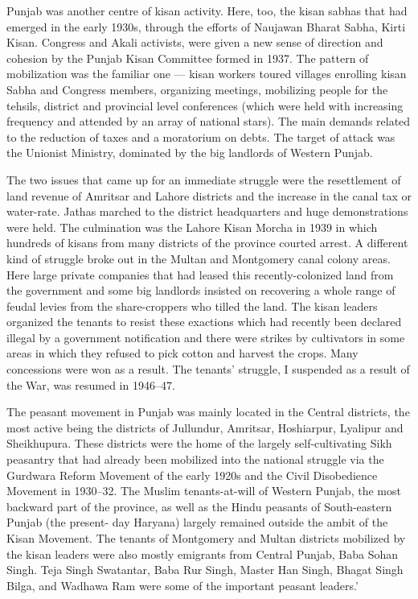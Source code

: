 Punjab was another centre of kisan activity. Here, too, the kisan sabhas that had emerged in the early 1930s, through the efforts of Naujawan Bharat Sabha, Kirti Kisan. Congress and Akali activists, were given a new sense of direction and cohesion by the Punjab Kisan Committee formed in 1937. The pattern of mobilization was the familiar one --- kisan workers toured villages enrolling kisan Sabha and Congress members, organizing meetings, mobilizing people for the tehsils, district and provincial level conferences (which were held with increasing frequency and attended by an array of national stars). The main demands related to the reduction of taxes and a moratorium on debts. The target of attack was the Unionist Ministry, dominated by the big landlords of Western Punjab.

The two issues that came up for an immediate struggle were the resettlement of land revenue of Amritsar and Lahore districts and the increase in the canal tax or water-rate. Jathas marched to the district headquarters and huge demonstrations were held. The culmination was the Lahore Kisan Morcha in 1939 in which hundreds of kisans from many districts of the province courted arrest. A different kind of struggle broke out in the Multan and Montgomery canal colony areas. Here large private companies that had leased this recently-colonized land from the government and some big landlords insisted on recovering a whole range of feudal levies from the share-croppers who tilled the land. The kisan leaders organized the tenants to resist these exactions which had recently been declared illegal by a government notification and there were strikes by cultivators in some areas in which they refused to pick cotton and harvest the crops. Many concessions were won as a result. The tenants' struggle, I suspended as a result of the War, was resumed in 1946--47.

The peasant movement in Punjab was mainly located in the Central districts, the most active being the districts of Jullundur, Amritsar, Hoshiarpur, Lyalipur and Sheikhupura. These districts were the home of the largely self-cultivating Sikh peasantry that had already been mobilized into the national struggle via the Gurdwara Reform Movement of the early 1920s and the Civil Disobedience Movement in 1930--32. The Muslim tenants-at-will of Western Punjab, the most backward part of the province, as well as the Hindu peasants of South-eastern Punjab (the present- day Haryana) largely remained outside the ambit of the Kisan Movement. The tenants of Montgomery and Multan districts mobilized by the kisan leaders were also mostly emigrants from Central Punjab, Baba Sohan Singh. Teja Singh Swatantar, Baba Rur Singh, Master Han Singh, Bhagat Singh Bilga, and Wadhawa Ram were some of the important peasant leaders.'

